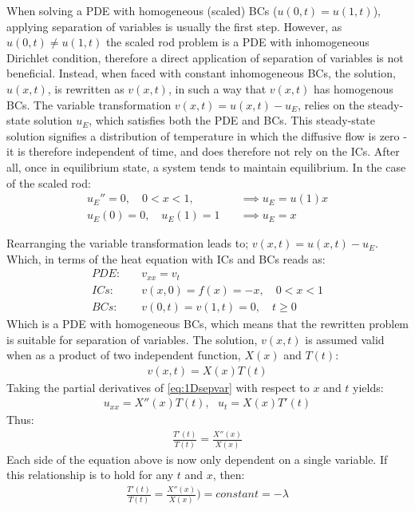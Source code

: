\documentclass[%
oneside,                 %
final,                   %
10pt]{article}
\begin{document}
When solving a PDE with homogeneous (scaled) BCs ($u(0,t)=u(1,t)$), applying separation of variables is usually the first step. However, as $u(0,t)\neq u(1,t)$ the scaled rod problem is a PDE with inhomogeneous Dirichlet condition, therefore a direct application of separation of variables is not beneficial. Instead, when faced with constant inhomogeneous BCs, the solution, $u(x,t)$, is rewritten as $v(x,t)$, in such a way that $v(x,t)$  has homogenous BCs.  \newline
The variable transformation $v(x,t)=u(x,t)-u_E$, relies on the steady-state solution $u_E$, which satisfies both the PDE and BCs. This steady-state solution signifies a distribution of temperature in which the diffusive flow is zero - it is therefore independent of time, and does therefore not rely on the ICs. After all, once in equilibrium state, a system tends to maintain equilibrium.  In the case of the scaled rod:
\begin{align}
u_E''=0,\quad 0<x<1, \quad &\implies u_E=u(1)x\\
u_E(0)=0, \quad u_E(1)=1 \quad &\implies u_E=x
\end{align}

Rearranging the variable transformation leads to; $v(x,t)=u(x,t)-u_E$. Which, in terms of the heat equation with ICs and BCs reads as:
\begin{align}
PDE:& \quad v_{xx}= v_t \\
ICs:& \quad v(x,0)=f(x)=-x, \quad 0 < x < 1 \label{eq:ICv}\\
BCs:& \quad v(0,t)= v(1,t)=0, \quad t\geq 0 
\end{align}
Which is a PDE with homogeneous BCs, which means that  the rewritten problem is suitable for separation of variables. The solution, $v(x,t)$ is assumed valid when as a product of two independent function, $X(x)$ and $T(t)$:
\begin{align}
v(x,t)=X(x)T(t) \label{eq:1Dsepvar}
\end{align}
Taking the partial derivatives of \eqref{eq:1Dsepvar} with respect to $x$ and $t$ yields:
\begin{align}
u_{xx}=X''(x)T(t), \text{		} u_t=X(x)T'(t)
\end{align}
Thus:
\begin{align}
\frac{T'(t)}{T(t)}=\frac{X''(x)}{X(x)} \label{1D.eq:Tt=Xx}
\end{align}
Each side of the equation above is now only dependent on a single variable. If this relationship is to hold for any $t$ and $x$, then:
\begin{align}
\frac{T'(t)}{T(t)}=\frac{X''(x)}{X(x)})=constant=-\lambda
\end{align}
\end{document}

